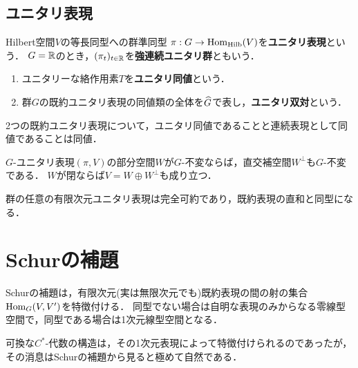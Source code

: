\documentclass[uplatex,dvipdfmx]{jsreport}
\begin{document}
\subsection{ユニタリ表現}

\begin{definition}
    Hilbert空間$V$の等長同型への群準同型
    $\pi:G\to\mathrm{Hom}_{\mathrm{Hilb}}(V)$を\textbf{ユニタリ表現}という．
    $G=\mathbb{R}$のとき，$(\pi_t)_{t\in\mathbb{R}}$を\textbf{強連続ユニタリ群}ともいう．
\end{definition}

\begin{definition}\mbox{}
    \begin{enumerate}
        \item ユニタリーな絡作用素$T$を\textbf{ユニタリ同値}という．
        \item 群$G$の既約ユニタリ表現の同値類の全体を$\widehat{G}$で表し，\textbf{ユニタリ双対}という．
    \end{enumerate}
\end{definition}
\begin{remark}
    2つの既約ユニタリ表現について，ユニタリ同値であることと連続表現として同値であることは同値．
\end{remark}

\begin{theorem}
    $G$-ユニタリ表現$(\pi,V)$の部分空間$W$が$G$-不変ならば，直交補空間$W^\perp$も$G$-不変である．
    $W$が閉ならば$V=W\oplus W^\perp$も成り立つ．
\end{theorem}

\begin{corollary}
    群の任意の有限次元ユニタリ表現は完全可約であり，既約表現の直和と同型になる．
\end{corollary}

\section{Schurの補題}

\begin{tcolorbox}[colframe=ForestGreen, colback=ForestGreen!10!white,breakable,colbacktitle=ForestGreen!40!white,coltitle=black,fonttitle=\bfseries\sffamily,
title=既約表現の間のホム集合の構造決定]
    Schurの補題は，有限次元(実は無限次元でも)既約表現の間の射の集合$\mathrm{Hom}_G(V,V')$を特徴付ける．
    同型でない場合は自明な表現のみからなる零線型空間で，同型である場合は1次元線型空間となる．

    可換な$C^*$-代数の構造は，その1次元表現によって特徴付けられるのであったが，その消息はSchurの補題から見ると極めて自然である．
\end{tcolorbox}
\end{document}
